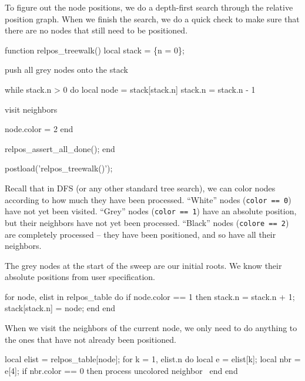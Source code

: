\nwendcode{}\nwdocspar

To figure out the node positions, we do a depth-first search
through the relative position graph.  When we finish the search,
we do a quick check to make sure that there are no nodes that
still need to be positioned.

\nwenddocs{}\plusendmoddef
function relpos_treewalk()
  local stack = \{n = 0\};

  \LA{}push all grey nodes onto the stack~{\nwtagstyle{}}\RA{}

  while stack.n > 0 do
    local node = stack[stack.n]
    stack.n = stack.n - 1

    \LA{}visit neighbors~{\nwtagstyle{}}\RA{}

    node.color = 2
  end

  relpos_assert_all_done();
end

postload('relpos_treewalk()');

\nwendcode{}\nwdocspar

Recall that in DFS (or any other standard tree search), we can
color nodes according to how much they have been processed.
``White'' nodes ({\tt{}color\ ==\ 0}) have not yet been visited.
``Grey'' nodes ({\tt{}color\ ==\ 1}) have an absolute position,
but their neighbors have not yet been processed.  ``Black'' nodes
({\tt{}colore\ ==\ 2}) are completely processed -- they have been
positioned, and so have all their neighbors.

The grey nodes at the start of the sweep are our initial roots.
We know their absolute positions from user specification.

\nwenddocs{}\endmoddef
for node, elist in relpos_table do
  if node.color == 1 then
    stack.n = stack.n + 1;
    stack[stack.n] = node;
  end
end
\nwendcode{}\nwdocspar

When we visit the neighbors of the current node, we only need
to do anything to the ones that have not already been positioned.

\nwenddocs{}\endmoddef
local elist = relpos_table[node];
for k = 1, elist.n do
  local e   = elist[k];
  local nbr = e[4]; 
  if nbr.color == 0 then
    \LA{}process uncolored neighbor~{\nwtagstyle{}}\RA{}
  end
end
\nwendcode{}\nwdocspar

